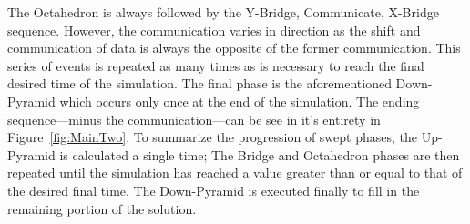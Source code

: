 \documentclass[review]{elsarticle}
\begin{document}
\par
The Octahedron is always followed by the Y-Bridge, Communicate, X-Bridge sequence. However, the communication varies in direction as the shift and communication of data is always the opposite of the former communication. This series of events is repeated as many times as is necessary to reach the final desired time of the simulation. The final phase is the aforementioned Down-Pyramid which occurs only once at the end of the simulation. The ending sequence---minus the communication---can be see in it's entirety in Figure~\ref{fig:MainTwo}. To summarize the progression of swept phases, the Up-Pyramid is calculated a single time; The Bridge and Octahedron phases are then repeated until the simulation has reached a value greater than or equal to that of the desired final time. The Down-Pyramid is executed finally to fill in the remaining portion of the solution.
\end{document}

